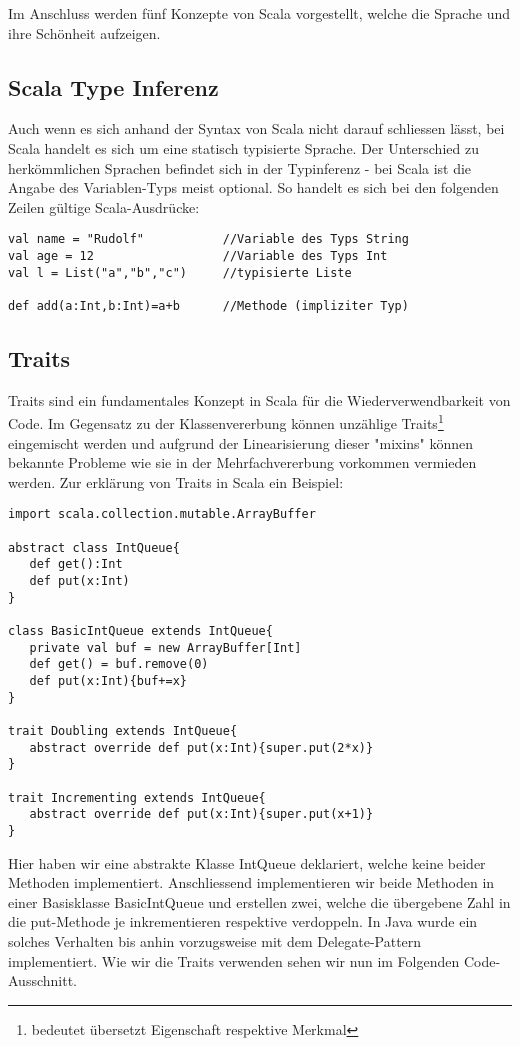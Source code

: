 Im Anschluss werden f\"unf Konzepte von Scala vorgestellt, welche die Sprache und ihre Sch\"onheit aufzeigen.

\subsection{Scala Type Inferenz}
Auch wenn es sich anhand der Syntax von Scala nicht darauf schliessen l\"asst, bei Scala handelt es sich um eine statisch typisierte Sprache. Der Unterschied zu herk\"ommlichen Sprachen befindet sich in der Typinferenz - bei Scala ist die Angabe des Variablen-Typs meist optional. So handelt es sich bei den folgenden Zeilen g\"ultige Scala-Ausdr\"ucke:

\begin{lstlisting}[caption=Typeinferenz in Scala]
val name = "Rudolf"           //Variable des Typs String
val age = 12                  //Variable des Typs Int
val l = List("a","b","c")     //typisierte Liste

def add(a:Int,b:Int)=a+b      //Methode (impliziter Typ)
\end{lstlisting}
\subsection{Traits}
Traits sind ein fundamentales Konzept in Scala f\"ur die Wiederverwendbarkeit von Code. Im Gegensatz zu der Klassenvererbung k\"onnen unz\"ahlige Traits\footnote{bedeutet \"ubersetzt Eigenschaft respektive Merkmal} eingemischt werden und aufgrund der Linearisierung dieser "mixins" k\"onnen bekannte Probleme wie sie in der Mehrfachvererbung vorkommen vermieden werden. Zur erkl\"arung von Traits in Scala ein Beispiel\cite[p. 222-227]{odersky2008programming}:

\begin{lstlisting}[caption=Klassen und Traits definieren]
import scala.collection.mutable.ArrayBuffer

abstract class IntQueue{
   def get():Int
   def put(x:Int)
}

class BasicIntQueue extends IntQueue{
   private val buf = new ArrayBuffer[Int]
   def get() = buf.remove(0)
   def put(x:Int){buf+=x}
}

trait Doubling extends IntQueue{
   abstract override def put(x:Int){super.put(2*x)}
}

trait Incrementing extends IntQueue{
   abstract override def put(x:Int){super.put(x+1)}
}
\end{lstlisting}
Hier haben wir eine abstrakte Klasse IntQueue deklariert, welche keine beider Methoden implementiert. Anschliessend implementieren wir beide Methoden in einer Basisklasse BasicIntQueue und erstellen zwei, welche die \"ubergebene Zahl in die put-Methode je inkrementieren respektive verdoppeln. In Java wurde ein solches Verhalten bis anhin vorzugsweise mit dem Delegate-Pattern implementiert.
Wie wir die Traits verwenden sehen wir nun im Folgenden Code-Ausschnitt. 


